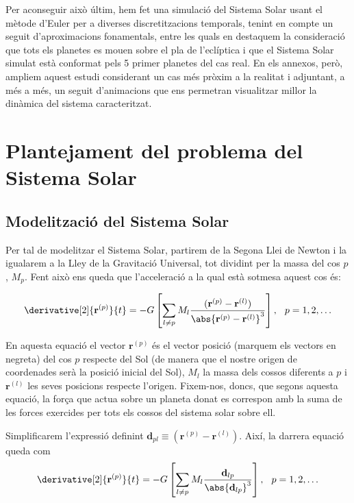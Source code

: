 \documentclass[10pt, twoside, a4paper]{article}
\begin{document}
Per aconseguir això últim, hem fet una simulació del Sistema Solar usant el mètode d'Euler per a diverses discretitzacions temporals, tenint en compte un seguit d'aproximacions fonamentals, entre les quals en destaquem la consideració que tots els planetes es mouen sobre el pla de l'eclíptica i que el Sistema Solar simulat està conformat pels 5 primer planetes del cas real. En els annexos, però, ampliem aquest estudi considerant un cas més pròxim a la realitat i adjuntant, a més a més, un seguit d'animacions que ens permetran visualitzar millor la dinàmica del sistema caracteritzat. 

\section{Plantejament del problema del Sistema Solar}

\subsection{Modelització del Sistema Solar}
Per tal de modelitzar el Sistema Solar, partirem de la Segona Llei de Newton i la igualarem a la Lley de la Gravitació Universal, tot dividint per la massa del cos $p$, $M_p$. Fent això ens queda que l'acceleració a la qual està sotmesa aquest cos és:

\begin{equation}
    \derivative[2]{\mathbf{r}^{(p)}}{t} = - G \left[ \sum_{l \neq p} M_l \frac{(\mathbf{r}^{(p)}-\mathbf{r}^{(l)})}{\abs{\mathbf{r}^{(p)} - \mathbf{r}^{(l)}}^3}\right], \hspace{0.25cm} p = 1, 2, \ldots 
\end{equation}

En aquesta equació el vector $\mathbf{r}^{(p)}$ és el vector posició (marquem els vectors en negreta) del cos $p$ respecte del Sol (de manera que el nostre origen de coordenades serà la posició inicial del Sol), $M_l$ la massa dels cossos diferents a $p$ i $\mathbf{r}^{(l)}$ les seves posicions respecte l'origen. Fixem-nos, doncs, que segons aquesta equació, la força que actua sobre un planeta donat es correspon amb la suma de les forces exercides per tots els cossos del sistema solar sobre ell. 

Simplificarem l'expressió definint $\mathbf{d}_{pl} \equiv (\mathbf{r}^{(p)}-\mathbf{r}^{(l)})$. Així, la darrera equació queda com
\begin{equation}
    \derivative[2]{\mathbf{r}^{(p)}}{t} = - G \left[ \sum_{l \neq p} M_l \frac{\mathbf{d}_{lp}}{\abs{\mathbf{d}_{lp}}^3}\right], \hspace{0.25cm} p = 1, 2, \ldots 
\end{equation}
\end{document}
